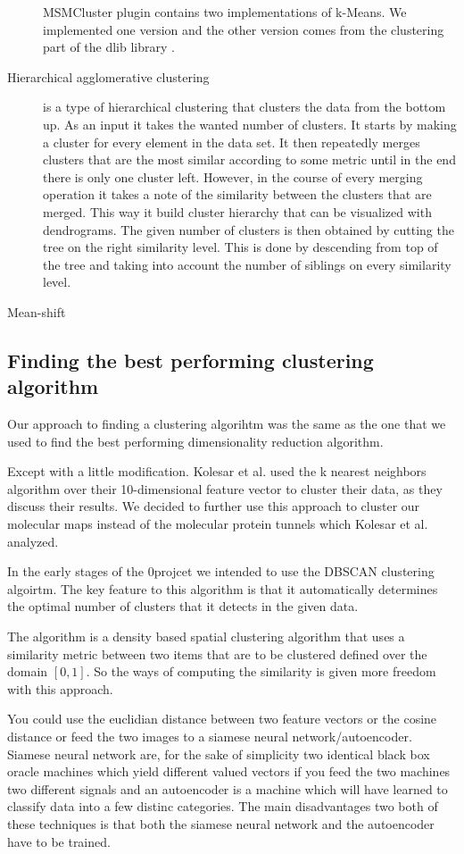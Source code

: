 \documentclass[journal]{vgtc}       %
\begin{document}
\begin{description}
MSMCluster plugin contains two implementations of k-Means. We implemented one version and the other version comes from the clustering part of the dlib library \cite{dlib09}.
\item [Hierarchical agglomerative clustering] is a type of hierarchical clustering that clusters the data from the bottom up. As an input it takes the wanted number of clusters. It starts by making a cluster for every element in the data set. It then repeatedly merges clusters that are the most similar according to some metric until in the end there is only one cluster left. However, in the course of every merging operation it takes a note of the similarity between the clusters that are merged. This way it build cluster hierarchy that can be visualized with dendrograms. The given number of clusters is then obtained by cutting the tree on the right similarity level. This is done by descending from top of the tree and taking into account the number of siblings on every similarity level.
\item [Mean-shift]
\end{description}




\subsection{Finding the best performing clustering algorithm}
Our approach to finding a clustering algorihtm was the same as the one that we used  to find the best performing dimensionality reduction algorithm.

Except with a little modification. Kolesar et al. \cite{kolesar} used the k nearest neighbors algorithm over their 10-dimensional feature vector to cluster their data, as they discuss their results. We decided to further use this approach to cluster our molecular maps instead of the molecular protein tunnels which Kolesar et al. analyzed.


In the early stages of the 0projcet we intended to use the DBSCAN clustering algoirtm. 
The key feature to this algorithm is that it automatically determines the optimal number of clusters that it detects in the given data. 

The algorithm is a density based spatial clustering algorithm that uses a similarity metric between two items that are to be  clustered defined over the domain \([0,1]\). So the ways of computing the similarity is given more freedom with this approach.


You could use the euclidian distance between two feature vectors or the cosine distance or feed the two images to a siamese neural network/autoencoder. Siamese neural network are, for the sake of simplicity two identical black box oracle machines which yield different valued vectors if you feed the two machines two different signals and  an autoencoder is a machine which will have learned to classify data into a few distinc categories. The main disadvantages two both of these techniques is that both the siamese neural network and the autoencoder have to be trained.
\end{document}
